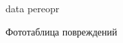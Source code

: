 \documentclass[a4paper,10pt]{report}
\begin{document}
%
%
%

 {data}
 {pereopr}


\Large{Фототаблица  повреждений }
\end{document}
